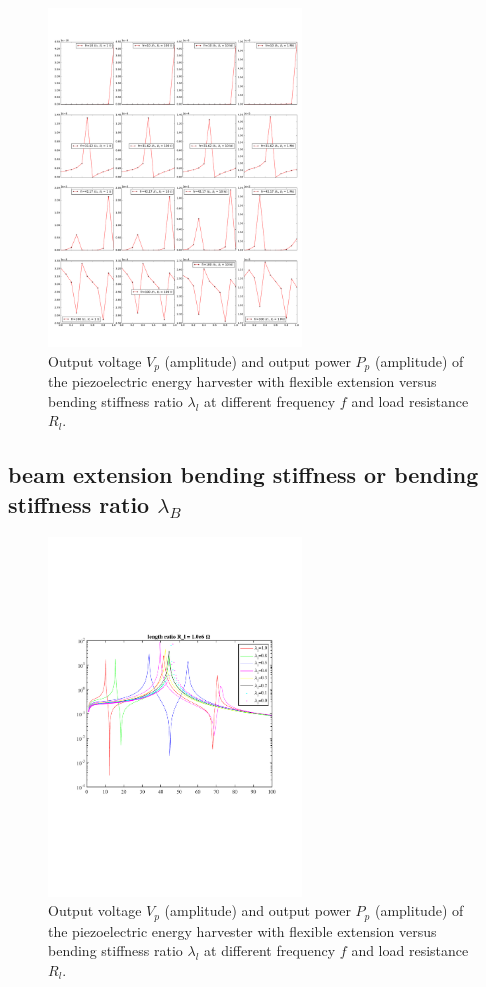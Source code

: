 \documentclass{elsarticle}
\begin{document}
\begin{figure}[!htbp]
    \centering
    \includegraphics[width=0.6\textwidth]{./fig_pow_fr_sl_Rl_sl_vs_laml}
    \caption{Output voltage $V_p$ (amplitude) and output power $P_p$ (amplitude) of the piezoelectric energy harvester with flexible extension versus bending stiffness ratio $\lambda_l$ at different frequency $f$ and load resistance $R_l$. }
    \label{fig:fig_pow_fr_sl_Rl_sl_vs_laml}
\end{figure}


\subsection{beam extension bending stiffness or bending stiffness ratio $\lambda_B$}


\begin{figure}[!htbp]
    \centering
    \includegraphics[width=0.6\textwidth]{./fig_laml_vol_versus_fr_Rl}
    \caption{Output voltage $V_p$ (amplitude) and output power $P_p$ (amplitude) of the piezoelectric energy harvester with flexible extension versus bending stiffness ratio $\lambda_l$ at different frequency $f$ and load resistance $R_l$. }
    \label{fig:fig_lamB_vol_versus_fr_Rl}
\end{figure}
\end{document}
